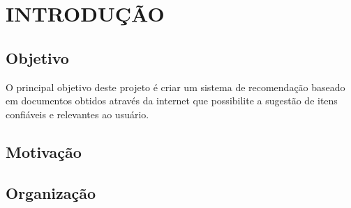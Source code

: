 \chapter{INTRODUÇÃO}  %

\section{Objetivo} %
\label{sec:objetivo}

 O principal objetivo deste projeto é criar um sistema de recomendação baseado em documentos obtidos através da internet que possibilite a sugestão de itens confiáveis e relevantes ao usuário.


\section{Motivação} %
\label{sec:motivação}





\section{Organização} %
\label{sec:organização}




